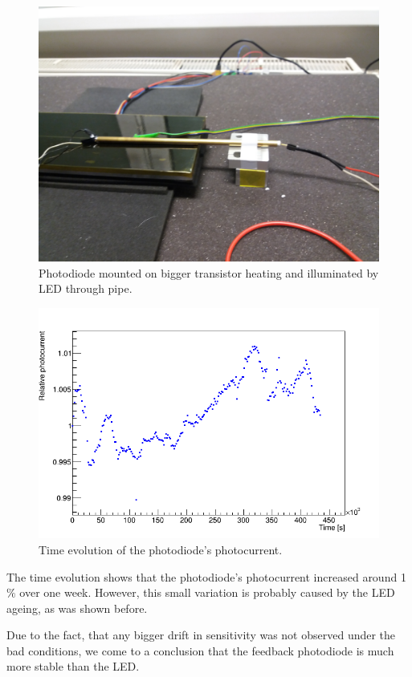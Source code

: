\begin{figure}[H]
 \centering
 \includegraphics[scale=0.08, angle=180]{./pictures/TempDestrc}
 \caption{Photodiode mounted on bigger transistor heating and illuminated by LED through pipe.}
 \label{aging}
\end{figure}


\begin{figure}[H]
 \centering
 \includegraphics[scale=0.5]{./pictures/ArtiAging}
 \caption{Time evolution of the photodiode's photocurrent.}
 \label{agingPhotoCurrent}
\end{figure}

The time evolution shows that the photodiode's photocurrent increased around 1 $\%$ over one week. However, this small variation is probably caused by the LED ageing, as was shown before. 
\par
Due to the fact, that any bigger drift in sensitivity was not observed under the bad conditions, we come to a conclusion that the feedback photodiode is much more stable than the LED.

